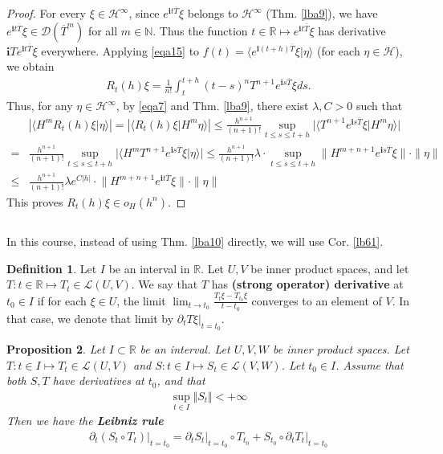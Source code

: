 \documentclass[12pt,b5paper,notitlepage]{article}
\theoremstyle{definition}
\newtheorem{df}{Definition}[section]
\theoremstyle{plain}
\newtheorem{pp}[df]{Proposition}
\newcommand{\mc}{\mathcal}
\newcommand{\ovl}{\overline}
\newcommand{\Dom}{\scr{D}}
\newcommand{\bk}[1]{\langle {#1}\rangle}
\newcommand{\scr}{\mathscr}
\newcommand{\im}{\mathbf{i}}
\newcommand{\Nbb}{\mathbb N}
\newcommand{\Rbb}{\mathbb R}
\newcommand{\dps}{\displaystyle}
\numberwithin{equation}{section}
\begin{document}
\begin{proof}
For every $\xi\in\mc H^\infty$, since $e^{\im t\ovl T}\xi$ belongs to $\mc H^\infty$ (Thm. \ref{lba9}), we have $e^{\im t\ovl T}\xi\in\Dom(\ovl T^m)$ for all $m\in\Nbb$. Thus the function $t\in\Rbb\mapsto e^{\im t\ovl T}\xi$ has derivative $\im Te^{\im t\ovl T}\xi$ everywhere. Applying \eqref{eqa15} to $f(t)=\bk{e^{\im(t+h)\ovl T}\xi|\eta}$ (for each $\eta\in\mc H$),  we obtain
\begin{align*}
R_t(h)\xi=\frac 1{n!}\int_t^{t+h}(t-s)^nT^{n+1}e^{\im s\ovl T}\xi ds.
\end{align*}
Thus, for any $\eta\in\mc H^\infty$, by \eqref{eqa7} and Thm. \ref{lba9}, there exist $\lambda,C>0$ such that
\begin{align*}
&|\bk{H^mR_t(h)\xi|\eta}|=|\bk{R_t(h)\xi|H^m\eta}|\leq \frac {h^{n+1}}{(n+1)!}\sup_{t\leq s\leq t+h}\big|\bk{T^{n+1}e^{\im s\ovl T}\xi|H^m\eta}\big|\\
=&\frac {h^{n+1}}{(n+1)!}\sup_{t\leq s\leq t+h}\big|\bk{H^mT^{n+1}e^{\im s\ovl T}\xi|\eta}\big|\leq\frac {h^{n+1}}{(n+1)!}\lambda\cdot\sup_{t\leq s\leq t+h}\lVert H^{m+n+1}e^{\im s\ovl T}\xi\lVert\cdot\lVert\eta\lVert\\
	\leq&\frac {h^{n+1}}{(n+1)!}\lambda e^{C|h|}\cdot\lVert H^{m+n+1}e^{\im t\ovl T}\xi\lVert\cdot\lVert\eta\lVert
\end{align*}
This proves $R_t(h)\xi\in o_H(h^n)$.
\end{proof}
	


\subsection{}


In this course, instead of using Thm. \ref{lba10} directly, we will use Cor. \ref{lb61}.

\begin{df}
Let $I$ be an interval in $\Rbb$. Let $U,V$ be inner product spaces, and let $T:t\in\Rbb\mapsto T_t\in\mc L(U,V)$. We say that $T$ has \textbf{(strong operator) derivative} at $t_0\in I$ if for each $\xi\in U$, the limit $\dps\lim_{t\rightarrow t_0}\frac{T_t\xi-T_{t_0}\xi}{t-t_0}$ converges to an element of $V$. In that case, we denote that limit by $\partial_tT\xi|_{t=t_0}$.
\end{df}


\begin{pp}\label{lb62}
Let $I\subset\Rbb$ be an interval. Let $U,V,W$ be inner product spaces. Let $T:t\in I\mapsto T_t\in\mc L(U,V)$ and $S:t\in I\mapsto S_t\in\mc L(V,W)$. Let $t_0\in I$. Assume that both $S,T$ have derivatives at $t_0$, and that
\begin{align}\label{eq84}
\sup_{t\in I}\Vert S_t\Vert<+\infty
\end{align}
Then we have the \textbf{Leibniz rule}
\begin{align*}
\partial_t(S_t\circ T_t)\big|_{t=t_0}=\partial_tS_t\big|_{t=t_0}\circ T_{t_0}+S_{t_0}\circ \partial_tT_t\big|_{t=t_0}
\end{align*}
\end{pp}
\end{document}
